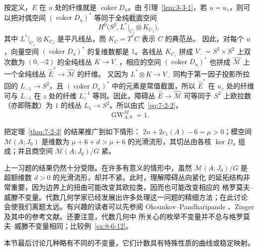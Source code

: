 \begin{example}
按定义，$E$ 在 $u$ 处的纤维就是 $\operatorname{coker}D_u$。由
引理~\ref{lem:3-3-1}，若 $u=u_z$，则可以把对偶空间
$(\operatorname{coker}D_u)^*$ 等同于全纯截面空间
\[
  H^0\bigl(S^2,L^*|_{C_z}\otimes K_{C_z}\bigr),
\]
其中 $L^*|_{C_z}\otimes K_{C_z}$ 是平凡线丛，而 $K_C=T^*C$ 表示 $C$ 的典范丛。
因此，对每个 $u$，向量空间 $(\operatorname{coker}D_u)^*$ 的复维数都是 $1$。各线丛
$K_{C_z}$ 拼成 $V_-=S^2\times S^2$ 上双次数为 $(0,-2)$ 的全纯线丛
$K\to V_-$，相应的空间 $(\operatorname{coker}D_u)^*$ 也拼成
$\widehat{\mathcal M}$ 上一个全纯线丛 $\widehat E^*\to\widehat{\mathcal M}$ 的纤维。
又因为 $L^*\otimes K\to V_-$ 同构于第一因子投影所拉回的
$L_{-1}\to S^2$，且 $(\operatorname{coker}D_u)^*$ 中的元素是常值截面，所以
$\widehat E^*$ 在 $u_z$ 处的纤维可与 $L_{-1}$ 在 $z$ 处的纤维
$L_z^{-1}$ 等同。因此，障碍丛
$\widehat E\to\widehat{\mathcal M}$ 可等同于 $S^2$ 上欧拉数（亦即陈数）为 $1$ 的线丛
$L_1\to S^2$。所以由式~\eqref{eq:7-2-2}，
\[
  \operatorname{GW}^{M}_{A,0}=1.
\]
\end{example}

\begin{exercise}\label{ex:7-2-6}
把定理~\ref{thm:7-2-3} 的结果推广到如下情形：
$2n+2c_1(A)-6=\mu>0$；模空间 $\mathcal M(A;J_0)$ 是维数为
$\mu+6+d>\mu+6$ 的光滑流形，其切丛由各核 $\ker D_u$ 组成；并且商空间
$\mathcal M(A;J_0)/G$ 紧。
\end{exercise}

上一习题的结果仍然十分受限。在许多有意义的情形中，虽然
$\mathcal M(A;J_0)/G$ 是超额维数 $d>0$ 的光滑流形，却并不紧。此时，理解障碍丛向紧化
的延拓结构非常重要，因为边界上的扭曲可能改变其欧拉类，因而也可能改变相应的
格罗莫夫--威滕不变量。代数几何学家已经发展出许多处理这一问题的精细方法；在此讨论
会使我们离题太远。有兴趣的读者可以先参阅 Okounkov--Pandharipande
、Zinger  及其中的参考文献。还要注意，代数几何中
所关心的枚举不变量并不总与格罗莫夫--威滕不变量相同；比较例~\ref{ex:8-6-12}。

本节最后讨论几种略有不同的不变量，它们计数具有特殊性质的曲线或稳定映射。

